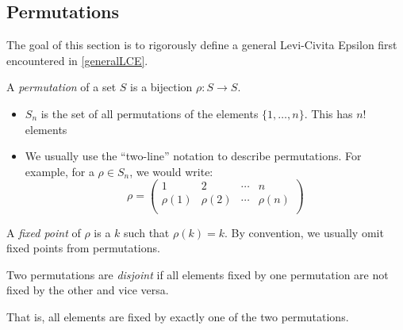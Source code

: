 \documentclass[../main.tex]{subfiles}
\begin{document}
\subsection{Permutations} \label{permutationSection}
The goal of this section is to rigorously define a general Levi-Civita Epsilon first encountered in \cref{generalLCE}.
\begin{definition}[Permutation]
  A \textit{permutation} of a set $S$ is a bijection $\rho: S \to S$.
\end{definition}
\begin{remark}[Notation]
  \begin{itemize}
    \item $S_n$ is the set of all permutations of the elements $\{1, \ldots, n\}$.
      This has $n!$ elements
    \item We usually use the ``two-line'' notation to describe permutations.
      For example, for a $\rho \in S_n$, we would write:
      \[
        \rho = \begin{pmatrix}
        1 & 2 & \cdots & n \\
        \rho(1) & \rho(2) & \cdots & \rho(n) \\
        \end{pmatrix}
      \]
  \end{itemize}
\end{remark}
\begin{definition}
  A \textit{fixed point} of $\rho$ is a $k$ such that $\rho(k) = k$.
  By convention, we usually omit fixed points from permutations.
\end{definition}
\begin{definition}[Disjoint]
  Two permutations are \textit{disjoint} if all elements fixed by one permutation are not fixed by the other and vice versa.

  That is, all elements are fixed by exactly one of the two permutations.
\end{definition}
\end{document}
